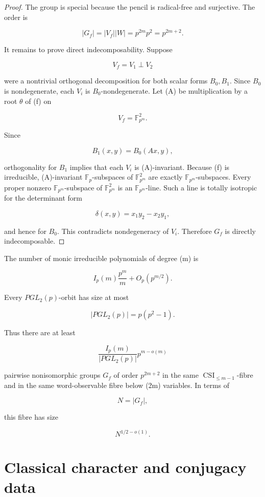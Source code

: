 \documentclass[11pt]{article}
\begin{document}
\begin{proof}
The group is special because the pencil is radical-free and surjective. The order is

\[
|G_f|=|V_f||W|=p^{2m}p^2=p^{2m+2}.
\]

It remains to prove direct indecomposability. Suppose

\[
V_f=V_1\perp V_2
\]

were a nontrivial orthogonal decomposition for both scalar forms $B_0,B_1$. Since $B_0$ is nondegenerate, each $V_i$ is $B_0$-nondegenerate. Let (A) be multiplication by a root $\theta$ of (f) on

\[
V_f=\mathbb F_{p^m}^2.
\]

Since

\[
B_1(x,y)=B_0(Ax,y),
\]

orthogonality for $B_1$ implies that each $V_i$ is (A)-invariant. Because (f) is irreducible, (A)-invariant $\mathbb F_p$-subspaces of $\mathbb F_{p^m}^2$ are exactly $\mathbb F_{p^m}$-subspaces. Every proper nonzero $\mathbb F_{p^m}$-subspace of $\mathbb F_{p^m}^2$ is an $\mathbb F_{p^m}$-line. Such a line is totally isotropic for the determinant form

\[
\delta(x,y)=x_1y_2-x_2y_1,
\]

and hence for $B_0$. This contradicts nondegeneracy of $V_i$. Therefore $G_f$ is directly indecomposable.

\end{proof}

The number of monic irreducible polynomials of degree (m) is

\[
I_p(m)
\frac{p^m}{m}+O_p(p^{m/2}).
\]

Every $PGL_2(p)$-orbit has size at most

\[
|PGL_2(p)|=p(p^2-1).
\]

Thus there are at least

\[
\frac{I_p(m)}{|PGL_2(p)|}
p^{m-o(m)}
\]

pairwise nonisomorphic groups $G_f$ of order $p^{2m+2}$ in the same $\operatorname{CSI}_{\le m-1}$-fibre and in the same word-observable fibre below (2m) variables. In terms of

\[
N=|G_f|,
\]

this fibre has size

\[
N^{1/2-o(1)}.
\]

\section{Classical character and conjugacy data}
\end{document}
